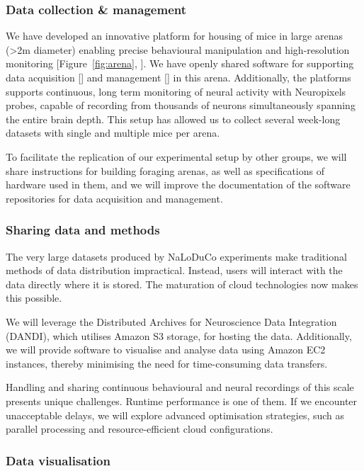 \subsubsection{Data collection \& management}

We have developed an innovative platform for housing of mice in large arenas
(\textgreater 2m diameter) enabling precise behavioural manipulation and
high-resolution monitoring [Figure~\ref{fig:arena}, \cite{campagnerEtAl24}].
%
We have openly shared software for supporting data acquisition
[\cite{aeonacquisition}] and management [\cite{aeonmecha}] in this
arena.
%
Additionally, the platforms supports continuous, long term monitoring of neural
activity with Neuropixels probes, capable of recording from thousands of
neurons simultaneously spanning the entire brain depth.
%
This setup has allowed us to collect several week-long datasets with single and
multiple mice per arena.

To facilitate the replication of our experimental setup by other groups, we
will share instructions for building foraging arenas, as well as specifications
of hardware used in them,
%
and we will improve the documentation of the software repositories for data
acquisition and management.



\subsubsection{Sharing data and methods}

The very large datasets produced by NaLoDuCo experiments make traditional
methods of data distribution impractical. Instead, users will interact with the
data directly where it is stored. The maturation of cloud technologies now
makes this possible.

We will leverage the Distributed Archives for Neuroscience Data Integration
(DANDI), which utilises Amazon S3 storage, for hosting the data. Additionally,
we will provide software to visualise and analyse data using Amazon EC2
instances, thereby minimising the need for time-consuming data transfers.

Handling and sharing continuous behavioural and neural recordings of this scale
presents unique challenges. Runtime performance is one of them. If we
encounter unacceptable delays, we will explore advanced optimisation
strategies, such as parallel processing and resource-efficient cloud
configurations.

\subsubsection{Data visualisation}

